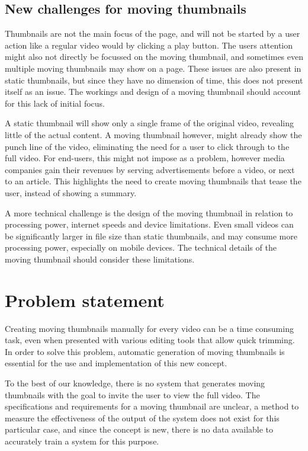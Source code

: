 \documentclass{../resources/acm_proc_article-sp}
\begin{document}
\subsection{New challenges for moving thumbnails}

Thumbnails are not the main focus of the page, and will not be started by a user action like a regular video would by clicking a play button. The users attention might also not directly be focussed on the moving thumbnail, and sometimes even multiple moving thumbnails may show on a page. These issues are also present in static thumbnails, but since they have no dimension of time, this does not present itself as an issue. The workings and design of a moving thumbnail should account for this lack of initial focus.

A static thumbnail will show only a single frame of the original video, revealing little of the actual content. A moving thumbnail however, might already show the punch line of the video, eliminating the need for a user to click through to the full video. For end-users, this might not impose as a problem, however media companies gain their revenues by serving advertisements before a video, or next to an article. This highlights the need to create moving thumbnails that tease the user, instead of showing a summary.

A more technical challenge is the design of the moving thumbnail in relation to processing power, internet speeds and device limitations. Even small videos can be significantly larger in file size than static thumbnails, and may consume more processing power, especially on mobile devices. The technical details of the moving thumbnail should consider these limitations.

\section{Problem statement}
\label{sec:problem statement}

Creating moving thumbnails manually for every video can be a time consuming task, even when presented with various editing tools that allow quick trimming. In order to solve this problem,  automatic generation of moving thumbnails is essential for the use and implementation of this new concept.

To the best of our knowledge, there is no system that generates moving thumbnails with the goal to invite the user to view the full video. The specifications and requirements for a moving thumbnail are unclear, a method to measure the effectiveness of the output of the system does not exist for this particular case, and since the concept is new, there is no data available to accurately train a system for this purpose.
\end{document}
